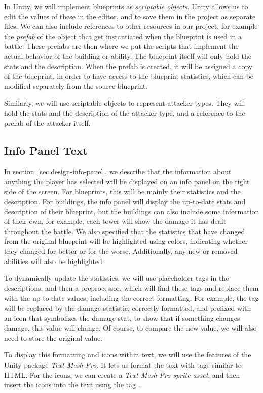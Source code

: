 In Unity, we will implement blueprints as \emph{scriptable objects}.
Unity allows us to edit the values of these in the editor, and to save them in the project as separate files.
We can also include references to other resources in our project, for example the \emph{prefab} of the object that get instantiated when the blueprint is used in a battle.
These prefabs are then where we put the scripts that implement the actual behavior of the building or ability.
The blueprint itself will only hold the stats and the description.
When the prefab is created, it will be assigned a copy of the blueprint, in order to have access to the blueprint statistics, which can be modified separately from the source blueprint.

Similarly, we will use scriptable objects to represent attacker types.
They will hold the stats and the description of the attacker type, and a reference to the prefab of the attacker itself.

\subsection{Info Panel Text}\label{sec:analysis-description-tags}
In section~\ref{sec:design-info-panel}, we describe that the information about anything the player has selected will be displayed on an info panel on the right side of the screen.
For blueprints, this will be mainly their statistics and the description.
For buildings, the info panel will display the up-to-date stats and description of their blueprint, but the buildings can also include some information of their own, for example, each tower will show the damage it has dealt throughout the battle.
We also specified that the statistics that have changed from the original blueprint will be highlighted using colors, indicating whether they changed for better or for the worse.
Additionally, any new or removed abilities will also be highlighted.

To dynamically update the statistics, we will use placeholder tags in the descriptions, and then a preprocessor, which will find these tags and replace them with the up-to-date values, including the correct formatting.
For example, the tag \mono{[DMG]} will be replaced by the damage statistic, correctly formatted, and prefixed with an icon that symbolizes the damage stat, to show that if something changes damage, this value will change.
Of course, to compare the new value, we will also need to store the original value.

To display this formatting and icons within text, we will use the features of the Unity package \emph{Text Mesh Pro}.
It lets us format the text with tags similar to HTML.
For the icons, we can create a \emph{Text Mesh Pro sprite asset}, and then insert the icons into the text using the tag .

